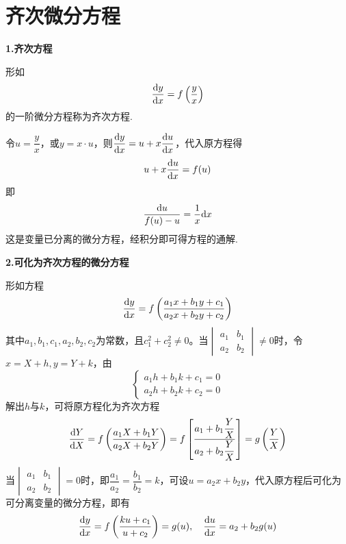 \section{齐次微分方程}
\textbf{1.齐次方程}

形如
\begin{equation*}
    \dfrac{\mathrm{d} y}{\mathrm{d} x}=f\left(\dfrac{y}{x}\right)
\end{equation*}
的一阶微分方程称为齐次方程.

令$u=\dfrac{y}{x}$，或$y=x\cdot u$，则$\dfrac{\mathrm{d} y}{\mathrm{d} x}=u+x\dfrac{\mathrm{d} u}{\mathrm{d} x}$，代入原方程得
\begin{equation*}
    u+x\dfrac{\mathrm{d} u}{\mathrm{d} x}=f(u)
\end{equation*}
即
\begin{equation*}
    \dfrac{\mathrm{d} u}{f(u)-u}=\dfrac{1}{x}\mathrm{d} x
\end{equation*}
这是变量已分离的微分方程，经积分即可得方程的通解.

\textbf{2.可化为齐次方程的微分方程}

形如方程
\begin{equation*}
    \dfrac{\mathrm{d} y}{\mathrm{d} x}=f\left(\dfrac{a_1x+b_1y+c_1}{a_2x+b_2y+c_2}\right)
\end{equation*}
其中$a_1,b_1,c_1,a_2,b_2,c_2$为常数，且$c_1^2+c_2^2\neq0$。当$\begin{vmatrix}
    a_1 & b_1 \\
    a_2 & b_2
\end{vmatrix}\neq0$时，令$x=X+h,y=Y+k$，由
\begin{equation*}
    \begin{cases}
        a_1h+b_1k+c_1=0 \\
        a_2h+b_2k+c_2=0
    \end{cases}
\end{equation*}
解出$h$与$k$，可将原方程化为齐次方程
\begin{equation*}
    \dfrac{\mathrm{d} Y}{\mathrm{d} X}=f\left(\dfrac{a_1X+b_1Y}{a_2X+b_2Y}\right)=f\left[\dfrac{a_1+b_1\dfrac{Y}{X}}{a_2+b_2\dfrac{Y}{X}}\right]=g\left(\dfrac{Y}{X}\right)
\end{equation*}
当$\begin{vmatrix}
    a_1 & b_1 \\
    a_2 & b_2
\end{vmatrix}=0$时，即$\dfrac{a_1}{a_2}=\dfrac{b_1}{b_2}=k$，可设$u=a_2x+b_2y$，代入原方程后可化为可分离变量的微分方程，即有
\begin{equation*}
    \dfrac{\mathrm{d} y}{\mathrm{d} x}=f\left(\dfrac{ku+c_1}{u+c_2}\right)=g(u), \quad \dfrac{\mathrm{d} u}{\mathrm{d} x}=a_2+b_2g(u)
\end{equation*}

